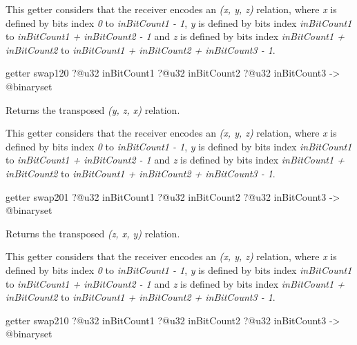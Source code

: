 This getter considers that the receiver encodes an \emph{(x, y, z)} relation, where \emph{x} is defined by bits index \emph{0} to \emph{inBitCount1  - 1}, \emph{y} is defined by bits index \emph{inBitCount1} to \emph{inBitCount1 + inBitCount2 - 1} and  \emph{z} is defined by bits index \emph{inBitCount1 + inBitCount2} to \emph{inBitCount1 + inBitCount2 + inBitCount3 - 1}.







\begin{galgas4box}
getter swap120
  ?@u32 inBitCount1
  ?@u32 inBitCount2
  ?@u32 inBitCount3
  -> @binaryset
\end{galgas4box}

Returns the transposed \emph{(y, z, x)} relation.

This getter considers that the receiver encodes an \emph{(x, y, z)} relation, where \emph{x} is defined by bits index \emph{0} to \emph{inBitCount1  - 1}, \emph{y} is defined by bits index \emph{inBitCount1} to \emph{inBitCount1 + inBitCount2 - 1} and  \emph{z} is defined by bits index \emph{inBitCount1 + inBitCount2} to \emph{inBitCount1 + inBitCount2 + inBitCount3 - 1}.







\begin{galgas4box}
getter swap201
  ?@u32 inBitCount1
  ?@u32 inBitCount2
  ?@u32 inBitCount3
  -> @binaryset
\end{galgas4box}

Returns the transposed \emph{(z, x, y)} relation.

This getter considers that the receiver encodes an \emph{(x, y, z)} relation, where \emph{x} is defined by bits index \emph{0} to \emph{inBitCount1  - 1}, \emph{y} is defined by bits index \emph{inBitCount1} to \emph{inBitCount1 + inBitCount2 - 1} and  \emph{z} is defined by bits index \emph{inBitCount1 + inBitCount2} to \emph{inBitCount1 + inBitCount2 + inBitCount3 - 1}.







\begin{galgas4box}
getter swap210
  ?@u32 inBitCount1
  ?@u32 inBitCount2
  ?@u32 inBitCount3
  -> @binaryset
\end{galgas4box}


